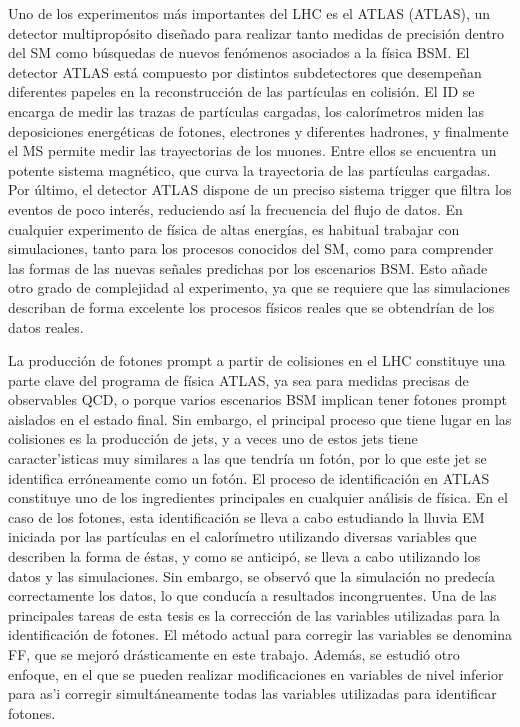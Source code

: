 Uno de los experimentos más importantes del \ac{LHC} es el \ac{ATLAS} (\acl{ATLAS}), un detector multipropósito diseñado para realizar tanto medidas de precisión dentro del \ac{SM} como búsquedas de nuevos fenómenos asociados a la física \ac{BSM}. El detector \ac{ATLAS} está compuesto por distintos subdetectores que desempeñan diferentes papeles en la reconstrucción de las partículas en colisión. El \acl{ID} se encarga de medir las trazas de partículas cargadas, los calorímetros miden las deposiciones energéticas de fotones, electrones y diferentes hadrones, y finalmente el \acl{MS} permite medir las trayectorias de los muones. Entre ellos se encuentra un potente sistema magnético, que curva la trayectoria de las partículas cargadas. Por último, el detector \ac{ATLAS} dispone de un preciso sistema trigger que filtra los eventos de poco interés, reduciendo así la frecuencia del flujo de datos.
En cualquier experimento de física de altas energías, es habitual trabajar con simulaciones, tanto para los procesos conocidos del \ac{SM}, como para comprender las formas de las nuevas señales predichas por los escenarios \ac{BSM}. Esto añade otro grado de complejidad al experimento, ya que se requiere que las simulaciones describan de forma excelente los procesos físicos reales que se obtendrían de los datos reales.

La producción de fotones prompt a partir de colisiones \pp en el \ac{LHC} constituye una parte clave del programa de física \ac{ATLAS}, ya sea para medidas precisas de observables \ac{QCD}, o porque varios escenarios \ac{BSM} implican tener fotones prompt aislados en el estado final. Sin embargo, el principal proceso que tiene lugar en las colisiones \pp es la producción de jets, y a veces uno de estos jets tiene caracter'isticas muy similares a las que tendría un fotón, por lo que este jet se identifica erróneamente como un fotón. El proceso de identificación en \ac{ATLAS} constituye uno de los ingredientes principales en cualquier análisis de física. En el caso de los fotones, esta identificación se lleva a cabo estudiando la lluvia \ac{EM} iniciada por las partículas en el calorímetro utilizando diversas variables que describen la forma de éstas, y como se anticipó, se lleva a cabo utilizando los datos y las simulaciones. Sin embargo, se observó que la simulación no predecía correctamente los datos, lo que conducía a resultados incongruentes.
Una de las principales tareas de esta tesis es la corrección de las variables utilizadas para la identificación de fotones. El método actual para corregir las variables se denomina \ac{FF}, que se mejoró drásticamente en este trabajo. Además, se estudió otro enfoque, en el que se pueden realizar modificaciones en variables de nivel inferior para as'i corregir simultáneamente todas las variables utilizadas para identificar fotones.

